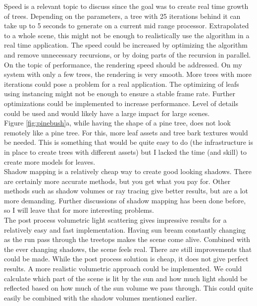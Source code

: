 \documentclass{article}
\begin{document}
  		Speed is a relevant topic to discuss since the goal was to create real time growth of trees. Depending on the parameters, a tree with 25 iterations behind it can take up to 5 seconds to generate on a current mid range processor. Extrapolated to a whole scene, this might not be enough to realistically use the algorithm in a real time application. The speed could be increased by optimizing the algorithm and remove unnecessary recursions, or by doing parts of the recursion in parallel. \\
  		
  		On the topic of performance, the rendering speed should be addressed. On my system with only a few trees, the rendering is very smooth. More trees with more iterations could pose a problem for a real application. The optimizing  of leafs using instancing might not be enough to ensure a stable frame rate. Further optimizations could be implemented to increase performance. Level of details could be used and would likely have a large impact for large scenes. \\
  		
  		Figure \ref{fig:pinebush}a, while having the shape of a pine tree, does not look remotely like a pine tree. For this, more leaf assets and tree bark textures would be needed. This is something that would be quite easy to do (the infrastructure is in place to create trees with different assets) but I lacked the time (and skill) to create more models for leaves. \\
  		
  		Shadow mapping is a relatively cheap way to create good looking shadows. There are certainly more accurate methods, but you get what you pay for. Other methods such as shadow volumes or ray tracing give better results, but are a lot more demanding. Further discussions of shadow mapping has been done before, so I will leave that for more interesting problems. \\
  		
  		The post process volumetric light scattering gives impressive results for a relatively easy and fast implementation. Having sun bream constantly changing as the run pass through the treetops makes the scene come alive. Combined with the ever changing shadows, the scene feels real. There are still improvements that could be made. While the post process solution is cheap, it does not give perfect results. A more realistic volumetric approach could be implemented. We could calculate which part of the scene is lit by the sun and how much light should be reflected based on how much of the sun volume we pass through. This could quite easily be combined with the shadow volumes mentioned earlier. \\
  		
\end{document}
